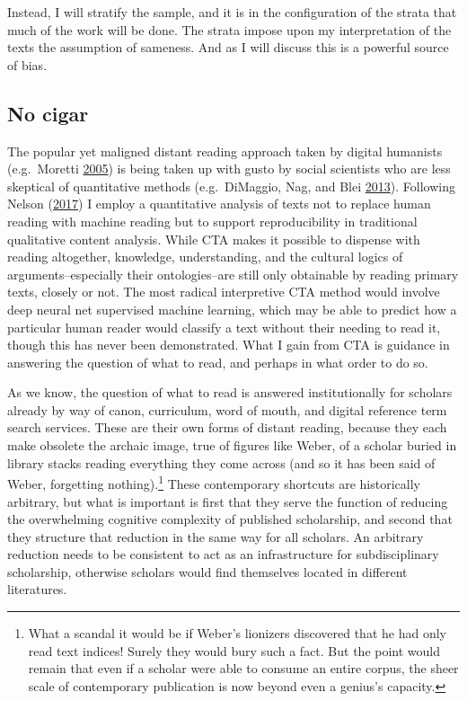 \documentclass[]{book}
\let\rmarkdownfootnote\footnote%
\def\footnote{\protect\rmarkdownfootnote}
\theoremstyle{definition}
\theoremstyle{definition}
\theoremstyle{definition}
\theoremstyle{remark}
\begin{document}
Instead, I will stratify the sample, and it is in the configuration of
the strata that much of the work will be done. The strata impose upon my
interpretation of the texts the assumption of sameness. And as I will
discuss this is a powerful source of bias.

\hypertarget{no-cigar}{%
\subsection{No cigar}\label{no-cigar}}

The popular yet maligned distant reading approach taken by digital
humanists (e.g.~Moretti \protect\hyperlink{ref-Moretti2005Graphs}{2005})
is being taken up with gusto by social scientists who are less skeptical
of quantitative methods (e.g.~DiMaggio, Nag, and Blei
\protect\hyperlink{ref-DiMaggio2013Exploiting}{2013}). Following Nelson
(\protect\hyperlink{ref-Nelson2017Computational}{2017}) I employ a
quantitative analysis of texts not to replace human reading with machine
reading but to support reproducibility in traditional qualitative
content analysis. While CTA makes it possible to dispense with reading
altogether, knowledge, understanding, and the cultural logics of
arguments--especially their ontologies--are still only obtainable by
reading primary texts, closely or not. The most radical interpretive CTA
method would involve deep neural net supervised machine learning, which
may be able to predict how a particular human reader would classify a
text without their needing to read it, though this has never been
demonstrated. What I gain from CTA is guidance in answering the question
of what to read, and perhaps in what order to do so.

As we know, the question of what to read is answered institutionally for
scholars already by way of canon, curriculum, word of mouth, and digital
reference term search services. These are their own forms of distant
reading, because they each make obsolete the archaic image, true of
figures like Weber, of a scholar buried in library stacks reading
everything they come across (and so it has been said of Weber,
forgetting nothing).\footnote{What a scandal it would be if Weber's
  lionizers discovered that he had only read text indices! Surely they
  would bury such a fact. But the point would remain that even if a
  scholar were able to consume an entire corpus, the sheer scale of
  contemporary publication is now beyond even a genius's capacity.}
These contemporary shortcuts are historically arbitrary, but what is
important is first that they serve the function of reducing the
overwhelming cognitive complexity of published scholarship, and second
that they structure that reduction in the same way for all scholars. An
arbitrary reduction needs to be consistent to act as an infrastructure
for subdisciplinary scholarship, otherwise scholars would find
themselves located in different literatures.
\end{document}
